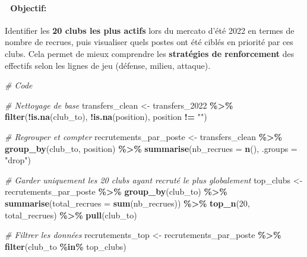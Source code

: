 \documentclass[
]{article}
\newenvironment{Shaded}{\begin{snugshade}}{\end{snugshade}}
\newcommand{\AttributeTok}[1]{\textcolor[rgb]{0.13,0.29,0.53}{#1}}
\newcommand{\CommentTok}[1]{\textcolor[rgb]{0.56,0.35,0.01}{\textit{#1}}}
\newcommand{\DecValTok}[1]{\textcolor[rgb]{0.00,0.00,0.81}{#1}}
\newcommand{\FunctionTok}[1]{\textcolor[rgb]{0.13,0.29,0.53}{\textbf{#1}}}
\newcommand{\NormalTok}[1]{#1}
\newcommand{\OtherTok}[1]{\textcolor[rgb]{0.56,0.35,0.01}{#1}}
\newcommand{\SpecialCharTok}[1]{\textcolor[rgb]{0.81,0.36,0.00}{\textbf{#1}}}
\newcommand{\StringTok}[1]{\textcolor[rgb]{0.31,0.60,0.02}{#1}}
\begin{document}
\paragraph{🎯 Objectif:}\label{objectif}

Identifier les \textbf{20 clubs les plus actifs} lors du mercato d'été
2022 en termes de nombre de recrues, puis visualiser quels postes ont
été ciblés en priorité par ces clubs. Cela permet de mieux comprendre
les \textbf{stratégies de renforcement} des effectifs selon les lignes
de jeu (défense, milieu, attaque).

\begin{Shaded}
\begin{Highlighting}[]
\CommentTok{\# Code}

\CommentTok{\# Nettoyage de base}
\NormalTok{transfers\_clean }\OtherTok{\textless{}{-}}\NormalTok{ transfers\_2022 }\SpecialCharTok{\%\textgreater{}\%}
  \FunctionTok{filter}\NormalTok{(}\SpecialCharTok{!}\FunctionTok{is.na}\NormalTok{(club\_to), }\SpecialCharTok{!}\FunctionTok{is.na}\NormalTok{(position), position }\SpecialCharTok{!=} \StringTok{""}\NormalTok{)}

\CommentTok{\# Regrouper et compter}
\NormalTok{recrutements\_par\_poste }\OtherTok{\textless{}{-}}\NormalTok{ transfers\_clean }\SpecialCharTok{\%\textgreater{}\%}
  \FunctionTok{group\_by}\NormalTok{(club\_to, position) }\SpecialCharTok{\%\textgreater{}\%}
  \FunctionTok{summarise}\NormalTok{(}\AttributeTok{nb\_recrues =} \FunctionTok{n}\NormalTok{(), }\AttributeTok{.groups =} \StringTok{"drop"}\NormalTok{)}

\CommentTok{\# Garder uniquement les 20 clubs ayant recruté le plus globalement}
\NormalTok{top\_clubs }\OtherTok{\textless{}{-}}\NormalTok{ recrutements\_par\_poste }\SpecialCharTok{\%\textgreater{}\%}
  \FunctionTok{group\_by}\NormalTok{(club\_to) }\SpecialCharTok{\%\textgreater{}\%}
  \FunctionTok{summarise}\NormalTok{(}\AttributeTok{total\_recrues =} \FunctionTok{sum}\NormalTok{(nb\_recrues)) }\SpecialCharTok{\%\textgreater{}\%}
  \FunctionTok{top\_n}\NormalTok{(}\DecValTok{20}\NormalTok{, total\_recrues) }\SpecialCharTok{\%\textgreater{}\%}
  \FunctionTok{pull}\NormalTok{(club\_to)}

\CommentTok{\# Filtrer les données}
\NormalTok{recrutements\_top }\OtherTok{\textless{}{-}}\NormalTok{ recrutements\_par\_poste }\SpecialCharTok{\%\textgreater{}\%}
  \FunctionTok{filter}\NormalTok{(club\_to }\SpecialCharTok{\%in\%}\NormalTok{ top\_clubs)}


\end{Highlighting}
\end{Shaded}
\end{document}

